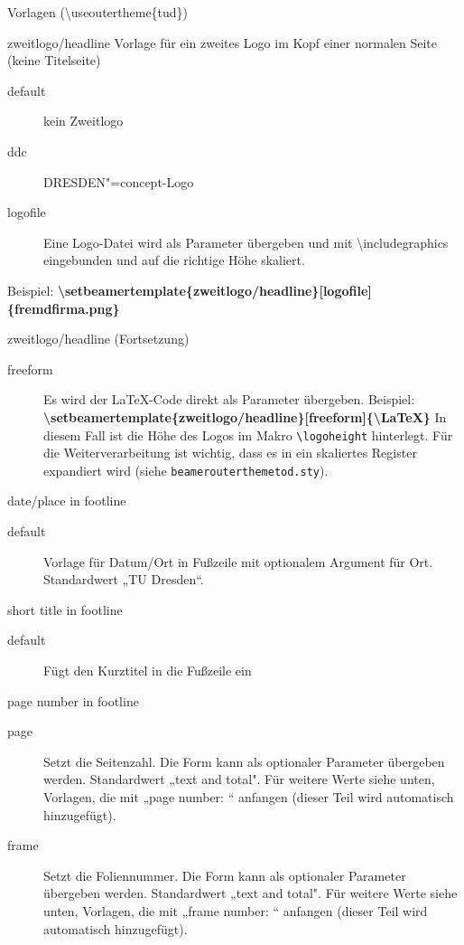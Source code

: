 \documentclass[presentation,t]{beamer}
\begin{document}
\begin{frame}[allowframebreaks]{Vorlagen (\textbackslash useoutertheme\{tud\})}
\begin{block}{zweitlogo/headline}
Vorlage für ein zweites Logo im Kopf einer normalen Seite (keine Titelseite)
\begin{description}
\item[{default}] kein Zweitlogo
\item[{ddc}] DRESDEN"=concept-Logo
\item[{logofile}] Eine Logo-Datei wird als Parameter übergeben und mit
\textbackslash includegraphics eingebunden und auf die
richtige Höhe skaliert.
\end{description}
Beispiel: 
\textbf{\textbackslash setbeamertemplate\{zweitlogo/headline\}[logofile]\{fremdfirma.png\}}
\end{block}
\begin{block}{zweitlogo/headline (Fortsetzung)}
\begin{description}
\item[{freeform}] Es wird der \LaTeX -Code direkt als Parameter übergeben. Beispiel:
\textbf{\textbackslash setbeamertemplate\{zweitlogo/headline\}[freeform]\{\textbackslash LaTeX\}}
In diesem Fall ist die Höhe des Logos im Makro
\texttt{\textbackslash logoheight} hinterlegt. Für die
Weiterverarbeitung ist wichtig, dass es in ein
skaliertes Register expandiert wird (siehe
\texttt{beamerouterthemetod.sty}).
\end{description}
\end{block}

\begin{block}{date/place in footline}
\begin{description}
\item[{default}] Vorlage für Datum/Ort in Fußzeile mit optionalem Argument
für Ort. Standardwert „TU Dresden“.
\end{description}
\end{block}

\begin{block}{short title in footline}
\begin{description}
\item[{default}] Fügt den Kurztitel in die Fußzeile ein
\end{description}
\end{block}

\begin{block}{page number in footline}
\small
\begin{description}
\item[{page}] Setzt die Seitenzahl. Die Form kann als optionaler Parameter
übergeben werden. Standardwert „text and total". Für weitere Werte
siehe unten, Vorlagen, die mit „page number: “ anfangen (dieser Teil
wird automatisch hinzugefügt).
\item[{frame}] Setzt die Foliennummer. Die Form kann als optionaler Parameter
übergeben werden. Standardwert „text and total". Für weitere Werte
siehe unten, Vorlagen, die mit „frame number: “ anfangen (dieser Teil
wird automatisch hinzugefügt).
\end{description}
\end{block}


\end{frame}
\end{document}
